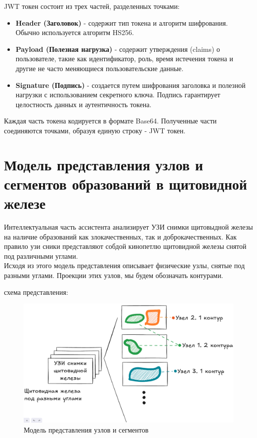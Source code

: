 JWT токен состоит из трех частей, разделенных точками:

\begin{itemize}
    \item \textbf{Header (Заголовок)} - содержит тип токена и алгоритм шифрования. Обычно используется алгоритм HS256.
    \item \textbf{Payload (Полезная нагрузка)} - содержит утверждения (claims) о пользователе, такие как идентификатор, роль, время истечения токена и другие не часто меняющиеся пользовательские данные.
    \item \textbf{Signature (Подпись)} - создается путем шифрования заголовка и полезной нагрузки с использованием секретного ключа. Подпись гарантирует целостность данных и аутентичность токена.
\end{itemize}

Каждая часть токена кодируется в формате Base64. Полученные части соединяются точками, образуя единую строку - JWT токен.


\section{Модель представления узлов и сегментов образований в щитовидной железе}

Интеллектуальная часть ассистента анализирует УЗИ снимки щитовыдной железы на наличие образований как злокачественных, так и доброкачественных. Как правило узи сники представляют собдой кинопетлю щитовидной железы снятой под различными углами. \\
Исходя из этого модель представления описывает физические узлы, снятые под разными углами. Проекции этих узлов, мы будем обозначать контурами.

схема представления:
\begin{figure}[H]%
	\begin{center}
		\includegraphics[width=.6\columnwidth]{./img/new/nodes_segments_model.png}%
	\end{center}
	\caption{Модель представления узлов и сегментов}%
	\label{pic:nodes_segments_model}%
\end{figure}

